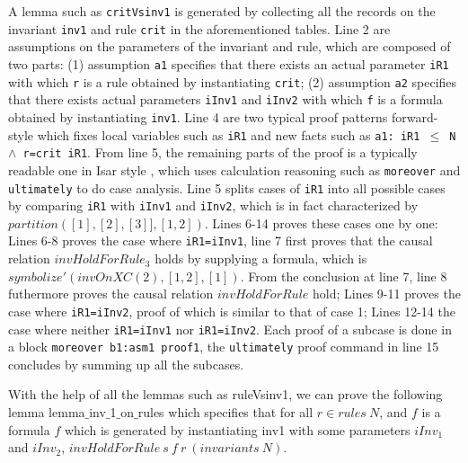 \documentclass{llncs}
\def \iInv {iInv}
\def \iR {iR}
\begin{document}
A lemma such as {\tt critVsinv1}  is generated by collecting all the records on the invariant {\tt inv1} and rule {\tt crit} in the aforementioned tables.
Line 2 are assumptions on the parameters of the invariant and rule, which are composed of two parts: (1) assumption {\tt a1} specifies that there exists an actual parameter {\tt \iR1} with which {\tt r} is a rule obtained by instantiating {\tt crit}; (2) assumption {\tt a2} specifies that  there exists   actual parameters {\tt \iInv1} and {\tt \iInv2} with which {\tt f} is a formula obtained by instantiating {\tt inv1}.
Line 4 are two typical  proof patterns forward-style which fixes local variables such as {\tt \iR1} and new facts such as {\tt a1: iR1 $\le$ N $\wedge$ r=crit \iR1}. From line 5, the remaining parts of the proof is a typically readable one in Isar style \cite{Wen99}, which uses calculation
reasoning such as {\tt moreover} and {\tt ultimately} to do  case analysis.
Line 5 splits cases of {\tt iR1} into all possible cases by comparing
{\tt \iR1} with {\tt \iInv1} and {\tt \iInv2}, which is in fact characterized by $partition([1],[2],[3]],[1,2])$. Lines 6-14  proves    these cases one by one: Lines 6-8 proves the case where {\tt iR1=\iInv1}, line 7 first proves that the causal relation $invHoldForRule_3$ holds by supplying a formula, which is $symbolize'(invOnXC(2),[1,2],[1])$. %
From the conclusion at line 7, line 8 futhermore proves the causal relation $invHoldForRule$ hold; Lines 9-11 proves the case where {\tt iR1=\iInv2}, proof of which is similar to that of case 1; Lines 12-14 the case   where neither {\tt iR1=\iInv1} nor {\tt iR1=\iInv2}. Each proof of a subcase is done in a block {\tt moreover b1:asm1 proof1}, the {\tt ultimately}  proof command in line 15 concludes by summing up all the subcases.




With the help of all the lemmas such as {\sf ruleVsinv1},  we can prove the following lemma  {\sf lemma$\_$inv$\_$1$\_$on$\_$rules} which
specifies that for all $r \in rules ~N$, and $f$ is a formula $f$ which is generated by instantiating inv1 with some parameters $\iInv_1$ and $iInv_2$, $invHoldForRule ~s~ f~ r~ (invariants~ N)$.
\end{document}
